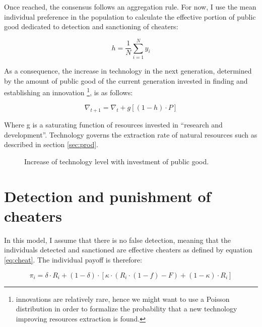 \documentclass[a4paper]{article}
\begin{document}
Once reached, the consensus follows an aggregation rule. For now, I use the mean individual preference in the population to calculate the effective portion of public good dedicated to detection and sanctioning of cheaters:

\begin{equation}
h=\frac{1}{N} \sum_{i=1}^{N}y_i
\end{equation}

As a consequence, the increase in technology in the next generation, determined by the amount of public good of the current generation invested in finding and establishing an innovation \footnote{innovations are relatively rare, hence we might want to use a Poisson distribution in order to formalize the probability that a new technology improving resources extraction is found.}, is as follows:

\begin{equation}
\nabla_{t+1}=\nabla_t + g[(1-h)\cdot P]
\end{equation}

Where g is a saturating function of resources invested in ``research and development''. Technology governs the extraction rate of natural resources such as described in section \ref{sec:prod}.

\begin{figure}[!htbp]
	\begin{center}
	\end{center}
	\caption{Increase of technology level with investment of public good.}
	\label{fig:techfunc}
\end{figure} 

\section{Detection and punishment of cheaters}
\label{sec:cheat}

In this model, I assume that there is no false detection, meaning that the individuals detected and sanctioned are effective cheaters as defined by equation \ref{eq:cheat}. The individual payoff is therefore:

\begin{equation}
\pi_i=\delta\cdot R_i+(1-\delta)\cdot[\kappa\cdot(R_i\cdot(1-f)-F)+(1-\kappa)\cdot R_i] 
\end{equation}
\end{document}

